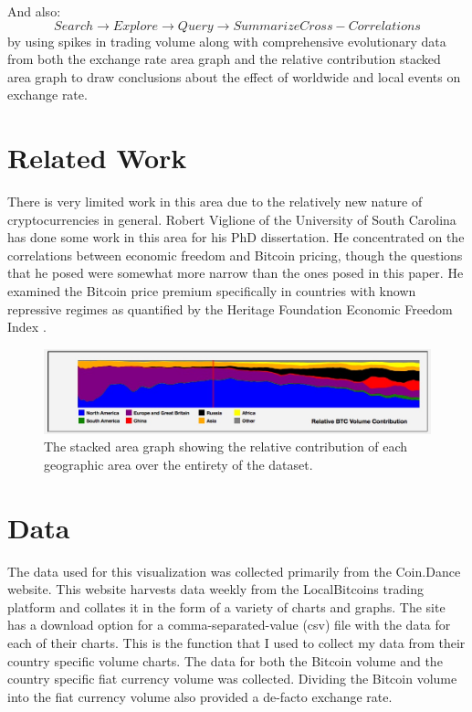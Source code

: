 \documentclass[journal]{vgtc}                %
\begin{document}
And also: 
\begin{equation}\label{key}
Search \rightarrow Explore \rightarrow Query \rightarrow Summarize Cross-Correlations
\end{equation}
by using spikes in trading volume along with comprehensive evolutionary data from both the exchange rate area graph and the relative contribution stacked area graph to draw conclusions about the effect of worldwide and local events on exchange rate.

\section{Related Work}

There is very limited work in this area due to the relatively new nature of cryptocurrencies in general.  Robert Viglione of the University of South Carolina \cite{rviglione-1} has done some work in this area for his PhD dissertation.  He concentrated on the correlations between economic freedom and Bitcoin pricing, though the questions that he posed were somewhat more narrow than the ones posed in this paper. He examined the Bitcoin price premium specifically in countries with known repressive regimes as quantified by the Heritage Foundation Economic Freedom Index \cite{heritage-1}.

\begin{figure}[tb]
 \centering %
 \includegraphics[width=\columnwidth]{stacked_area}
 \caption{The stacked area graph showing the relative contribution of each geographic area over the entirety of the dataset.}
 \label{fig:sample}
\end{figure}

\section {Data}
The data used for this visualization was collected primarily from the Coin.Dance \cite{coind-1} website.  This website harvests data weekly from the LocalBitcoins trading platform and collates it in the form of a variety of charts and graphs.  The site has a download option for a comma-separated-value (csv) file with the data for each of their charts.  This is the function that I used to collect my data from their country specific volume charts. The data for both the Bitcoin volume and the country specific fiat currency volume was collected.  Dividing the Bitcoin volume into the fiat currency volume also provided a de-facto exchange rate. 
\end{document}
